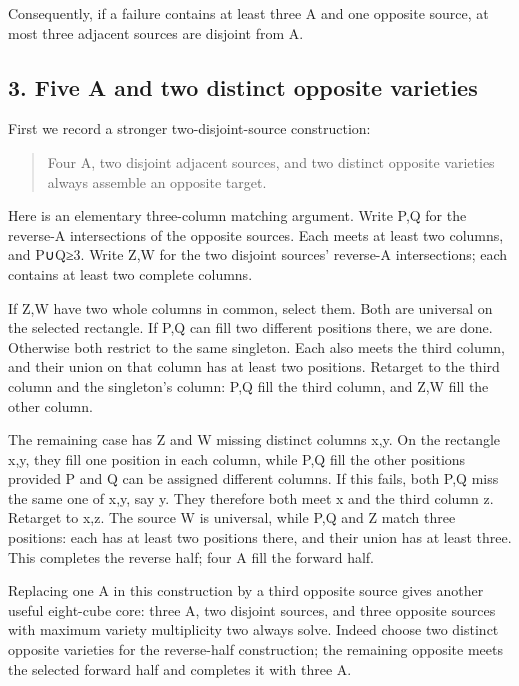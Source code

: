 \documentclass[
  10pt,
]{article}
\begin{document}
Consequently, if a failure contains at least three A and one opposite
source, at most three adjacent sources are disjoint from A.

\hypertarget{five-a-and-two-distinct-opposite-varieties}{%
\subsection*{3. Five A and two distinct opposite
varieties}\label{five-a-and-two-distinct-opposite-varieties}}

First we record a stronger two-disjoint-source construction:

\begin{quote}
Four A, two disjoint adjacent sources, and two distinct opposite
varieties always assemble an opposite target.
\end{quote}

Here is an elementary three-column matching argument. Write P,Q for the
reverse-A intersections of the opposite sources. Each meets at least two
columns, and \textbar P∪Q\textbar≥3. Write Z,W for the two disjoint
sources' reverse-A intersections; each contains at least two complete
columns.

If Z,W have two whole columns in common, select them. Both are universal
on the selected rectangle. If P,Q can fill two different positions
there, we are done. Otherwise both restrict to the same singleton. Each
also meets the third column, and their union on that column has at least
two positions. Retarget to the third column and the singleton's column:
P,Q fill the third column, and Z,W fill the other column.

The remaining case has Z and W missing distinct columns x,y. On the
rectangle x,y, they fill one position in each column, while P,Q fill the
other positions provided P and Q can be assigned different columns. If
this fails, both P,Q miss the same one of x,y, say y. They therefore
both meet x and the third column z. Retarget to x,z. The source W is
universal, while P,Q and Z match three positions: each has at least two
positions there, and their union has at least three. This completes the
reverse half; four A fill the forward half.

Replacing one A in this construction by a third opposite source gives
another useful eight-cube core: three A, two disjoint sources, and three
opposite sources with maximum variety multiplicity two always solve.
Indeed choose two distinct opposite varieties for the reverse-half
construction; the remaining opposite meets the selected forward half and
completes it with three A.
\end{document}
